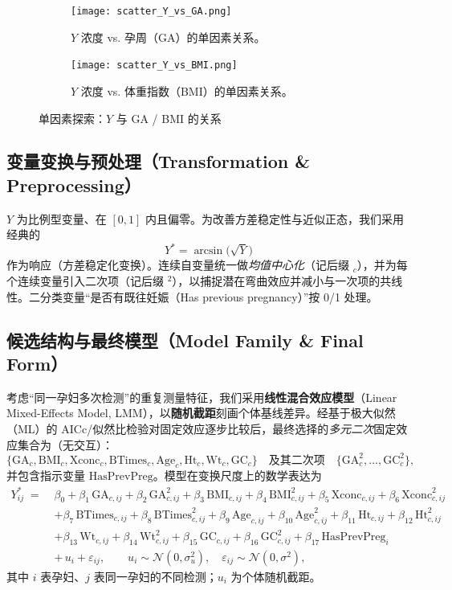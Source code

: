 \documentclass[12pt,a4paper]{ctexart}
\numberwithin{equation}{section}
\theoremstyle{mcm}
\begin{document}
{\begin{figure}[H]\centering
  \begin{subfigure}[t]{.48\linewidth}
    \texttt{[image: scatter\_Y\_vs\_GA.png]}
    \caption{$Y$ 浓度 vs. 孕周（GA）的单因素关系。}
    \label{fig:ga_scatter}
  \end{subfigure}\hfill%
  \begin{subfigure}[t]{.48\linewidth}
    \texttt{[image: scatter\_Y\_vs\_BMI.png]}
    \caption{$Y$ 浓度 vs. 体重指数（BMI）的单因素关系。}
    \label{fig:bmi_scatter}
  \end{subfigure}
  \caption{单因素探索：$Y$ 与 GA / BMI 的关系}
  \label{fig:q1_single_factor_pair}
\end{figure}


\subsection{变量变换与预处理（Transformation \& Preprocessing）}
$Y$ 为比例型变量、在 $[0,1]$ 内且偏零。为改善方差稳定性与近似正态，我们采用经典的
\[
  Y^{*}=\arcsin\!\big(\sqrt{Y}\big)
\]
作为响应（方差稳定化变换）。连续自变量统一做\emph{均值中心化}（记后缀 \(_c\)），并为每个连续变量引入二次项（记后缀 \(^2\)），以捕捉潜在弯曲效应并减小与一次项的共线性。二分类变量“是否有既往妊娠（Has previous pregnancy）”按 0/1 处理。

\subsection{候选结构与最终模型（Model Family \& Final Form）}
考虑“同一孕妇多次检测”的重复测量特征，我们采用\textbf{线性混合效应模型}（Linear Mixed-Effects Model, LMM），以\textbf{随机截距}刻画个体基线差异。经基于极大似然（ML）的 AICc/似然比检验对固定效应逐步比较后，最终选择的\emph{多元二次}固定效应集合为（无交互）：
\[
\{\text{GA}_c,\text{BMI}_c,\text{Xconc}_c,\text{BTimes}_c,\text{Age}_c,\text{Ht}_c,\text{Wt}_c,\text{GC}_c\}
\quad\text{及其二次项}\quad
\{\text{GA}_c^2,\ldots,\text{GC}_c^2\},
\]
并包含指示变量 \(\mathrm{HasPrevPreg}\)。模型在变换尺度上的数学表达为
\begin{equation}
\label{eq:final_lmm}
\begin{aligned}
Y^{*}_{ij} \;=\;& \beta_0 
 + \beta_1\,\mathrm{GA}_{c,ij} + \beta_2\,\mathrm{GA}_{c,ij}^{2}
 + \beta_3\,\mathrm{BMI}_{c,ij} + \beta_4\,\mathrm{BMI}_{c,ij}^{2}
 + \beta_5\,\mathrm{Xconc}_{c,ij} + \beta_6\,\mathrm{Xconc}_{c,ij}^{2} \\
&+ \beta_7\,\mathrm{BTimes}_{c,ij} + \beta_8\,\mathrm{BTimes}_{c,ij}^{2}
 + \beta_9\,\mathrm{Age}_{c,ij} + \beta_{10}\,\mathrm{Age}_{c,ij}^{2}
 + \beta_{11}\,\mathrm{Ht}_{c,ij} + \beta_{12}\,\mathrm{Ht}_{c,ij}^{2} \\
&+ \beta_{13}\,\mathrm{Wt}_{c,ij} + \beta_{14}\,\mathrm{Wt}_{c,ij}^{2}
 + \beta_{15}\,\mathrm{GC}_{c,ij} + \beta_{16}\,\mathrm{GC}_{c,ij}^{2}
 + \beta_{17}\,\mathrm{HasPrevPreg}_{i} \\
&+\, u_i + \varepsilon_{ij}, 
\qquad u_i\sim\mathcal{N}(0,\sigma_u^2),\quad \varepsilon_{ij}\sim\mathcal{N}(0,\sigma^2),
\end{aligned}
\end{equation}
其中 \(i\) 表孕妇、\(j\) 表同一孕妇的不同检测；\(u_i\) 为个体随机截距。

}
\end{document}
